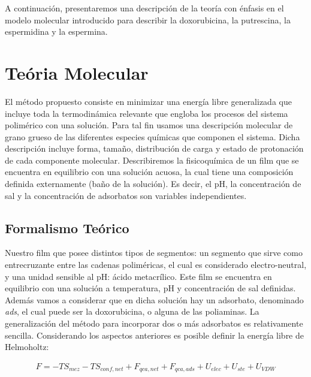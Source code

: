 A continuaci\'on, presentaremos una descripci\'on de la teor\'ia con \'enfasis en el modelo molecular introducido para describir la doxorubicina, la putrescina, la espermidina y la espermina.


\section{Te\'oria Molecular } \label{sec:film-teoria}

El m\'etodo propuesto consiste en minimizar una energ\'ia libre generalizada que incluye toda la termodin\'amica relevante que engloba los procesos del sistema polim\'erico con una soluci\'on. Para tal fin  usamos  una descripci\'on molecular de grano grueso de las diferentes especies qu\'imicas que componen el sistema.
Dicha descripci\'on incluye forma, tama\~no, distribuci\'on de carga  y estado de protonaci\'on de cada componente molecular.
Describiremos la fisicoqu\'imica de un film  que  se encuentra en  equilibrio con una soluci\'on acuosa, la cual  tiene una composici\'on  definida externamente (ba\~no de la soluci\'on).
Es decir, el pH, la concentraci\'on de sal y la concentraci\'on de adsorbatos son variables independientes.

\subsection{Formalismo Te\'orico}
Nuestro film que posee distintos tipos de segmentos: un segmento que sirve como entrecruzante entre las cadenas polim\'ericas, el cual es considerado electro-neutral, y  una unidad sensible al pH:  \'acido metacr\'ilico.
Este film  se encuentra en equilibrio con una soluci\'on a temperatura, pH y concentraci\'on de sal definidas. Adem\'as vamos a considerar que en dicha soluci\'on hay un adsorbato, denominado \textit{ads}, el cual puede ser la doxorubicina, o alguna de las poliaminas.
La generalizaci\'on del m\'etodo para incorporar dos o m\'as adsorbatos es relativamente sencilla.
Considerando los aspectos anteriores es posible definir la energ\'ia libre de Helmoholtz:

\begin{align}
 	F = -TS_{mez} -TS_{conf,net} + F_{qca,net} + F_{qca,ads} + U_{elec} + U_{ste} + U_{VDW}
 	\label{eq:film:libre-film}
\end{align}
 
